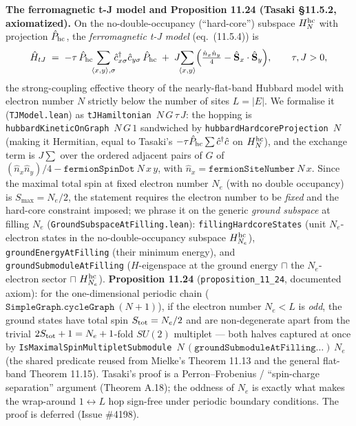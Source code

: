 \documentclass[a4paper,11pt]{article}
\begin{document}
\medskip\noindent\textbf{The ferromagnetic t-J model and Proposition 11.24 (Tasaki §11.5.2,
axiomatized).}  On the no-double-occupancy (``hard-core'') subspace $H_N^{\rm hc}$ with
projection $\hat P_{\rm hc}$, the \emph{ferromagnetic t-J model} (eq.~(11.5.4)) is
\[
  \hat H_{tJ} \;=\; -\tau\,\hat P_{\rm hc}\!\!\sum_{\langle x,y\rangle,\sigma}\!\!
    \hat c^\dagger_{x\sigma}\hat c_{y\sigma}\,\hat P_{\rm hc}
  \;+\; J\!\!\sum_{\langle x,y\rangle}\!\Big(\tfrac{\hat n_x\hat n_y}{4}
    - \hat{\mathbf S}_x\cdot\hat{\mathbf S}_y\Big),
  \qquad \tau,J>0,
\]
the strong-coupling effective theory of the nearly-flat-band Hubbard model with electron
number $N$ strictly below the number of sites $L=|E|$.  We formalise it
(\texttt{TJModel.lean}) as \texttt{tJHamiltonian}~$N\,G\,\tau\,J$: the hopping is
\texttt{hubbardKineticOnGraph}~$N\,G\,1$ sandwiched by \texttt{hubbardHardcoreProjection}~$N$
(making it Hermitian, equal to Tasaki's $-\tau\hat P_{\rm hc}\sum\hat c^\dagger\hat c$ on
$H_N^{\rm hc}$), and the exchange term is $J\sum$ over the ordered adjacent pairs of $G$ of
$(\hat n_x\hat n_y)/4 - \texttt{fermionSpinDot}~N\,x\,y$, with $\hat n_x=\texttt{fermionSiteNumber}~N\,x$.
Since the maximal total spin at fixed electron number $N_e$ (with no double occupancy) is
$S_{\max}=N_e/2$, the statement requires the electron number to be \emph{fixed} and the
hard-core constraint imposed; we phrase it on the generic \emph{ground subspace} at filling
$N_e$ (\texttt{GroundSubspaceAtFilling.lean}): \texttt{fillingHardcoreStates} (unit
$N_e$-electron states in the no-double-occupancy subspace $H_{N_e}^{\rm hc}$),
\texttt{groundEnergyAtFilling} (their minimum energy), and
\texttt{groundSubmoduleAtFilling} ($H$-eigenspace at the ground energy $\sqcap$ the
$N_e$-electron sector $\sqcap$ $H_{N_e}^{\rm hc}$).  \textbf{Proposition
11.24} (\texttt{proposition\_11\_24}, documented axiom): for the one-dimensional periodic chain
($\texttt{SimpleGraph.cycleGraph}~(N+1)$), if the electron number $N_e<L$ is \emph{odd}, the
ground states have total spin $S_{\rm tot}=N_e/2$ and are non-degenerate apart from the trivial
$2S_{\rm tot}+1=N_e+1$-fold $SU(2)$ multiplet --- both halves captured at once by
\texttt{IsMaximalSpinMultipletSubmodule}~$N\,(\texttt{groundSubmoduleAtFilling}\dots)\,N_e$ (the
shared predicate reused from Mielke's Theorem 11.13 and the general flat-band Theorem 11.15).
Tasaki's proof is a Perron--Frobenius /
``spin-charge separation'' argument (Theorem A.18); the oddness of $N_e$ is exactly what makes
the wrap-around $1\leftrightarrow L$ hop sign-free under periodic boundary conditions.  The proof
is deferred (Issue \#4198).
\end{document}
